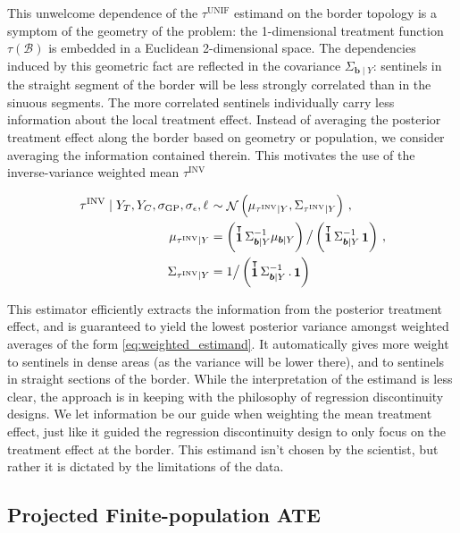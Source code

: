 \documentclass[letter]{article}
\DeclareMathOperator{\normal}{\mathcal{N}}
\DeclareMathOperator{\ones}{\mathbf{1}}
\newcommand{\trans}{^{\intercal}}
\newcommand{\sigmaf}{\sigma_{\mathrm{GP}}}
\newcommand{\sigman}{\sigma_{\epsilon}}
\newcommand{\boundary}{\mathcal{B}}
\newcommand{\sentinels}{\bm{b}}
\newcommand{\unifavg}{\tau^{\mathrm{UNIF}}}
\newcommand{\invvar}{\tau^{\mathrm{INV}}}
\newcommand{\eqlabel}[1]{\label{#1}}
\begin{document}
This unwelcome dependence of the \(\unifavg\) estimand on the border topology is a symptom of the geometry of the problem: the 1-dimensional treatment function \(\tau(\boundary)\) is embedded in a Euclidean 2-dimensional space.
The dependencies induced by this geometric fact are reflected in the covariance \(\Sigma_{\sentinels \mid Y}\): sentinels in the straight segment of the border will be less strongly correlated than in the sinuous segments.
The more correlated sentinels individually carry less information about the local treatment effect.
Instead of averaging the posterior treatment effect along the border based on geometry or population, we consider averaging the information contained therein.
This motivates the use of the inverse-variance weighted mean \(\invvar\)

\begin{equation}
\begin{split}
    \left. \invvar \mid Y_T, Y_C, \sigmaf, \sigman, \ell \right. &\sim \normal\del{\mu_{\invvar \mid Y}, \Sigma_{\invvar \mid Y}} \,, \\
    \mu_{\invvar \mid Y} &= \del{\ones\trans \Sigma_{\sentinels \mid Y}^{-1} \mu_{\sentinels \mid Y}} \big/ \del{\ones\trans \Sigma_{\sentinels \mid Y}^{-1} \ones} \,, \\
    \Sigma_{\invvar \mid Y} &= 1 \big/ \del{\ones\trans \Sigma_{\sentinels \mid Y}^{-1} \,. \ones}
\end{split}
\eqlabel{eq:invvar}
\end{equation}

This estimator efficiently extracts the information from the posterior treatment effect, and is guaranteed to yield the lowest posterior variance amongst weighted averages of the form \eqref{eq:weighted_estimand}.
It automatically gives more weight to sentinels in dense areas (as the variance will be lower there), and to sentinels in straight sections of the border.
While the interpretation of the estimand is less clear, the approach is in keeping with the philosophy of regression discontinuity designs.
We let information be our guide when weighting the mean treatment effect, just like it guided the regression discontinuity design to only focus on the treatment effect at the border.
This estimand isn't chosen by the scientist, but rather it is dictated by the limitations of the data.
    


    	\subsection{Projected Finite-population ATE}\label{projected-finite-population-ate}
\end{document}
